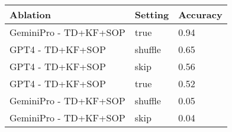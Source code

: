 \begin{tabular}{lll}
\toprule
Ablation & Setting & Accuracy \\
\midrule
GeminiPro - TD+KF+SOP & true & 0.94 \\
GPT4 - TD+KF+SOP & shuffle & 0.65 \\
GPT4 - TD+KF+SOP & skip & 0.56 \\
GPT4 - TD+KF+SOP & true & 0.52 \\
GeminiPro - TD+KF+SOP & shuffle & 0.05 \\
GeminiPro - TD+KF+SOP & skip & 0.04 \\
\bottomrule
\end{tabular}
